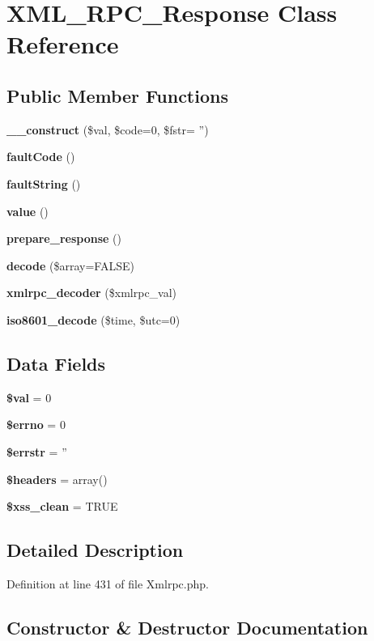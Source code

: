 \section{X\-M\-L\-\_\-\-R\-P\-C\-\_\-\-Response Class Reference}
\label{class_x_m_l___r_p_c___response}
\subsection*{Public Member Functions}
\begin{DoxyCompactItemize}
\item 
{\bf \-\_\-\-\_\-construct} (\$val, \$code=0, \$fstr= '')
\item 
{\bf fault\-Code} ()
\item 
{\bf fault\-String} ()
\item 
{\bf value} ()
\item 
{\bf prepare\-\_\-response} ()
\item 
{\bf decode} (\$array=F\-A\-L\-S\-E)
\item 
{\bf xmlrpc\-\_\-decoder} (\$xmlrpc\-\_\-val)
\item 
{\bf iso8601\-\_\-decode} (\$time, \$utc=0)
\end{DoxyCompactItemize}
\subsection*{Data Fields}
\begin{DoxyCompactItemize}
\item 
{\bf \$val} = 0
\item 
{\bf \$errno} = 0
\item 
{\bf \$errstr} = ''
\item 
{\bf \$headers} = array()
\item 
{\bf \$xss\-\_\-clean} = T\-R\-U\-E
\end{DoxyCompactItemize}


\subsection{Detailed Description}


Definition at line 431 of file Xmlrpc.\-php.



\subsection{Constructor \& Destructor Documentation}
